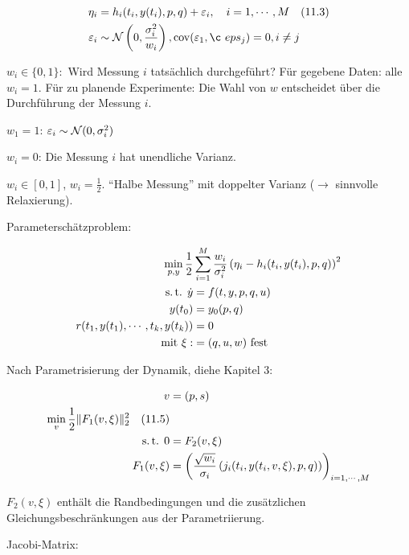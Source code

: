 
\begin{align*}
\eta_i &= h_i(t_i, y(t_i), p, q) + \eps_i, \quad i = 1,\cdots,M \quad (11.3) \\
\eps_i & \sim \mathcal N \l( 0, \frac{\sigma_i^2}{w_i} \r), \cov (\eps_1, ¸eps_j) = 0, i\neq j \\
\end{align*}

$w_i \in \{0,1\}:$ Wird Messung $i$ tatsächlich durchgeführt? Für gegebene Daten: alle $w_i=1$. Für zu planende Experimente: Die Wahl von $w$ entscheidet über die Durchführung der Messung $i$.

\bitm
\item $w_1 = 1$: $\varepsilon_i \sim \mathcal N(0, \sigma_i^2)$
\item $w_i = 0$: Die Messung $i$ hat unendliche Varianz.
\item $w_i \in [0,1]$, \zb $w_i = \frac 12$. "`Halbe Messung"' mit doppelter Varianz ($\to$ sinnvolle Relaxierung).
\eitm

Parameterschätzproblem:

\begin{align*}
\min_{p,y} \frac 12 &\sum\limits_{i=1}^M \frac{w_i}{\sigma_i^2} \left( \eta_i - h_i(t_i, y(t_i), p, q) \right)^2 \\
\text{s.\,t. } \dot y &= f(t,y,p,q,u) \\
y(t_0) &= y_0(p,q) \\
r(t_1, y(t_1), \cdots, t_k, y(t_k)) &= 0 \\
\text{mit } \xi :&=  (q,u,w) \text{ fest} \\
\end{align*}

Nach Parametrisierung der Dynamik, diehe Kapitel 3:

\begin{align*}
v &= (p,s) \\
\min_{v} \frac 12 \|F_1(v,\xi)\|_2^2 \quad (11.5) \\
\text{s.\,t. } 0 &= F_2(v, \xi) \\
F_1(v,\xi) &= \left( \frac{\sqrt{w_i}}{\sigma_i} \left( j_i(t_i,y(t_i, v, \xi), p, q) \right) \right)_{i=1,\cdots,M} \\
\end{align*}

$F_2(v,\xi)$ enthält die Randbedingungen und die zusätzlichen Gleichungsbeschränkungen aus der Parametriierung.

Jacobi-Matrix:

